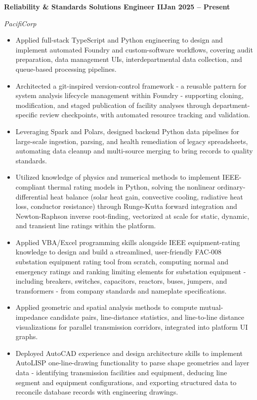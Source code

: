 \documentclass[10pt, letterpaper]{article}
\newcommand{\jobline}[2]{%
  \vspace{5pt}%
  \noindent\textbf{#1}\hfill\textbf{#2}\par%
  \vspace{1pt}%
}
\newcommand{\subline}[1]{%
  \vspace{-1pt}%
  \noindent\textit{#1}\par%
  \vspace{1pt}%
}
\newenvironment{rlist}{%
  \begin{itemize}[leftmargin=1.4em, itemsep=1pt, topsep=2pt, parsep=0pt]%
}{%
  \end{itemize}%
}
\begin{document}
\jobline{Reliability \& Standards Solutions Engineer II}{Jan 2025 -- Present}
\subline{PacifiCorp}
\begin{rlist}
  \item Applied full-stack TypeScript and Python engineering to design and implement automated Foundry and custom-software workflows, covering audit preparation, data management UIs, interdepartmental data collection, and queue-based processing pipelines.
  \item Architected a git-inspired version-control framework - a reusable pattern for system analysis lifecycle management within Foundry - supporting cloning, modification, and staged publication of facility analyses through department-specific review checkpoints, with automated resource tracking and validation.
  \item Leveraging Spark and Polars, designed backend Python data pipelines for large-scale ingestion, parsing, and health remediation of legacy spreadsheets, automating data cleanup and multi-source merging to bring records to quality standards.
  \item Utilized knowledge of physics and numerical methods to implement IEEE-compliant thermal rating models in Python, solving the nonlinear ordinary-differential heat balance (solar heat gain, convective cooling, radiative heat loss, conductor resistance) through Runge-Kutta forward integration and Newton-Raphson inverse root-finding, vectorized at scale for static, dynamic, and transient line ratings within the platform.
  \item Applied VBA/Excel programming skills alongside IEEE equipment-rating knowledge to design and build a streamlined, user-friendly FAC-008 substation equipment rating tool from scratch, computing normal and emergency ratings and ranking limiting elements for substation equipment - including breakers, switches, capacitors, reactors, buses, jumpers, and transformers - from company standards and nameplate specifications.
  \item Applied geometric and spatial analysis methods to compute mutual-impedance candidate pairs, line-distance statistics, and line-to-line distance visualizations for parallel transmission corridors, integrated into platform UI graphs.
  \item Deployed AutoCAD experience and design architecture skills to implement AutoLISP one-line-drawing functionality to parse shape geometries and layer data - identifying transmission facilities and equipment, deducing line segment and equipment configurations, and exporting structured data to reconcile database records with engineering drawings.
\end{rlist}
\end{document}
